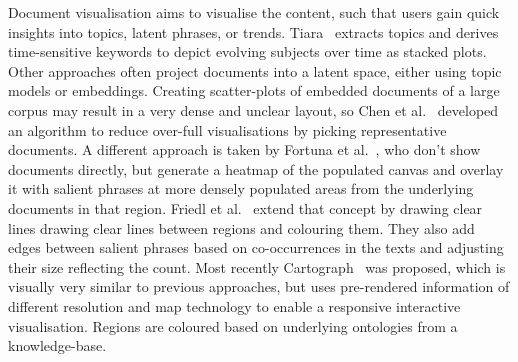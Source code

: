 %
%

Document visualisation aims to visualise the content, such that users gain quick insights into topics, latent phrases, or trends.
Tiara~\cite{wei2010tiara} extracts topics and derives time-sensitive keywords to depict evolving subjects over time as stacked plots.
Other approaches often project documents into a latent space, either using topic models or embeddings.
Creating scatter-plots of embedded documents of a large corpus may result in a very dense and unclear layout, so Chen et al.~\cite{chen2009exemplar} developed an algorithm to reduce over-full visualisations by picking representative documents.
A different approach is taken by Fortuna et al.~\cite{fortuna2005visualization}, who don't show documents directly, but generate a heatmap of the populated canvas and overlay it with salient phrases at more densely populated areas from the underlying documents in that region.
Friedl et al.~\cite{fried2014maps} extend that concept by drawing clear lines drawing clear lines between regions and colouring them.
They also add edges between salient phrases based on co-occurrences in the texts and adjusting their size reflecting the count.
Most recently Cartograph~\cite{sen2017cartograph} was proposed, which is visually very similar to previous approaches, but uses pre-rendered information of different resolution and map technology to enable a responsive interactive visualisation. Regions are coloured based on underlying ontologies from a knowledge-base.

